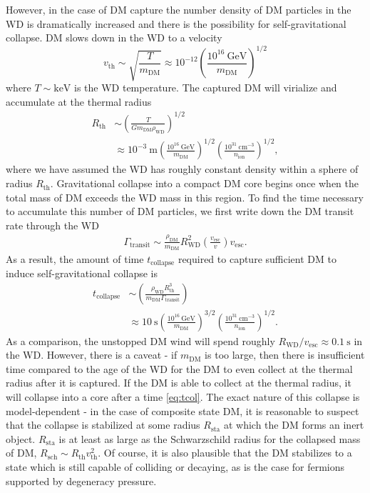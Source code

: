 \documentclass[twocolumn,preprintnumbers,amsmath,amssymb,prl, superscriptaddress]{revtex4}
\newcommand{\GeV}{\text{GeV}}
\newcommand{\keV}{\text{keV}}
\newcommand{\cm}{\text{cm}}
\def\r{\right)}
\def\l{\left(}
\begin{document}
However, in the case of DM capture the number density of DM particles in the WD is dramatically increased and there is the possibility for self-gravitational collapse.
DM slows down in the WD to a velocity 
\begin{equation}
v_\text{th} \sim \sqrt{\frac{T}{m_\text{DM}}} \approx 10^{-12} \l \frac{10^{16} ~\GeV}{m_\text{DM}}\r^{1/2}
\end{equation}
where $T \sim \keV$ is the WD temperature. 
The captured DM will virialize and accumulate at the thermal radius 
\begin{align}
R_\text{th} &\sim \l \frac{T}{G m_\text{DM} \rho_\text{WD}}\r^{1/2} \\
&\approx 10^{-3} ~\text{m} \l \frac{10^{16} ~\GeV}{m_\text{DM}}\r^{1/2} \l \frac{10^{31} ~\cm^{-3}}{n_\text{ion}}\r^{1/2}, \nonumber
\end{align}
where we have assumed the WD has roughly constant density within a sphere of radius $R_\text{th}$. 
Gravitational collapse into a compact DM core begins once when the total mass of DM exceeds the WD mass in this region. 
To find the time necessary to accumulate this number of DM particles, we first write down the DM transit rate through the WD
\begin{align}
\Gamma_\text{transit} \sim \frac{\rho_{\text{DM}}}{m_\text{DM}} R_\text{WD}^2 \l\frac{v_\text{esc}}{v}\r v_\text{esc}.
\label{eq:TransitFluxCondition}
\end{align}
As a result, the amount of time $t_\text{collapse}$ required to capture sufficient DM to induce self-gravitational collapse is 
\begin{align}
\label{eq:tcol}
t_\text{collapse} &\sim \l \frac{\rho_\text{WD} R_\text{th}^3}{m_\text{DM} \Gamma_\text{transit}} \r \\
&\approx 10 ~\text{s} \l \frac{10^{16} ~\GeV}{m_\text{DM}} \r^{3/2} \l \frac{10^{31} ~\cm^{-3}}{n_\text{ion}}\r^{1/2}.
\end{align}
As a comparison, the unstopped DM wind will spend roughly $R_\text{WD}/v_\text{esc} \approx 0.1 ~\text{s}$ in the WD.
However, there is a caveat - if $m_\text{DM}$ is too large, then there is insufficient time compared to the age of the WD for the DM to even collect at the thermal radius after it is captured. 
If the DM is able to collect at the thermal radius, it will collapse into a core after a time \eqref{eq:tcol}.
The exact nature of this collapse is model-dependent - in the case of composite state DM, it is reasonable to suspect that the collapse is stabilized at some radius $R_\text{sta}$ at which the DM forms an inert object.
$R_\text{sta}$ is at least as large as the Schwarzschild radius for the collapsed mass of DM, $R_\text{sch} \sim R_\text{th} v_\text{th}^2$. 
Of course, it is also plausible that the DM stabilizes to a state which is still capable of colliding or decaying, as is the case for fermions supported by degeneracy pressure. 
\end{document}
